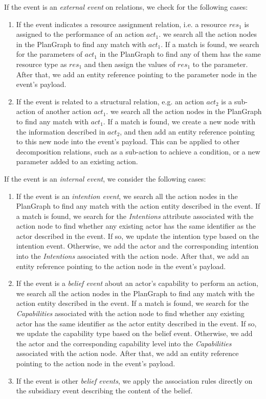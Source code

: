 If the event is an \emph{external event} on relations, we check for the following cases:
\begin{enumerate}
	\item If the event indicates a resource assignment relation, i.e. a resource $res_1$ is assigned to the performance of an action $act_1$. we search all the action nodes in the PlanGraph to find any match with $act_1$. If a match is found, we search for the parameters of $act_1$ in the PlanGraph to find any of them has the same resource type as $res_1$ and then assign the values of $res_1$ to the parameter. After that, we add an entity reference pointing to the parameter node in the event's payload. 
	\item If the event is related to a structural relation, e.g. an action $act_2$ is a sub-action of another action $act_1$. we search all the action nodes in the PlanGraph to find any match with $act_1$. If a match is found, we create a new node with the information described in $act_2$, and then add an entity reference pointing to this new node into the event's payload. This can be applied to other decomposition relations, such as a sub-action to achieve a condition, or a new parameter added to an existing action.
\end{enumerate}

If the event is an \emph{internal event}, we consider the following cases:
\begin{enumerate}
	\item If the event is an \emph{intention event}, we search all the action nodes in the PlanGraph to find any match with the action entity described in the event. If a match is found, we search for the \emph{Intentions} attribute associated with the action node to find whether any existing actor has the same identifier as the actor described in the event. If so, we update the intention type based on the intention event. Otherwise, we add the actor and the corresponding intention into the \emph{Intentions} associated with the action node. After that, we add an entity reference pointing to the action node in the event's payload. 
	\item If the event is a \emph{belief event} about an actor's capability to perform an action, we search all the action nodes in the PlanGraph to find any match with the action entity described in the event. If a match is found, we search for the \emph{Capabilities} associated with the action node to find whether any existing actor has the same identifier as the actor entity described in the event. If so, we update the capability type based on the belief event. Otherwise, we add the actor and the corresponding capability level into the \emph{Capabilities} associated with the action node. After that, we add an entity reference pointing to the action node in the event's payload. 
	\item If the event is other \emph{belief events}, we apply the association rules directly on the subsidiary event describing the content of the belief. 
\end{enumerate}

